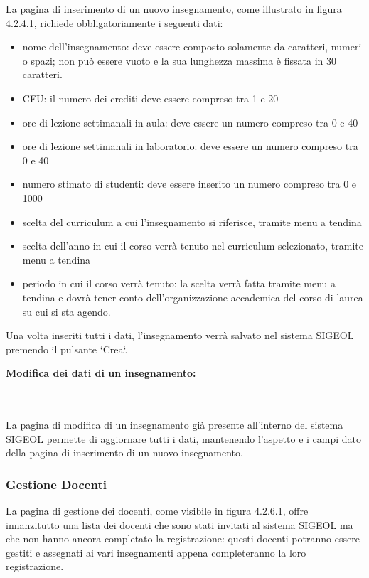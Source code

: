 \documentclass[11pt,a4paper]{article}
\begin{document}
La pagina di inserimento di un nuovo insegnamento, come illustrato in figura 4.2.4.1, richiede obbligatoriamente i seguenti dati:
\begin{itemize}
 \item nome dell'insegnamento: deve essere composto solamente da caratteri, numeri o spazi; non può essere vuoto e la sua lunghezza massima è fissata in 30 caratteri.
 \item CFU: il numero dei crediti deve essere compreso tra 1 e 20
 \item ore di lezione settimanali in aula: deve essere un numero compreso tra 0 e 40
 \item ore di lezione settimanali in laboratorio: deve essere un numero compreso tra 0 e 40
 \item numero stimato di studenti: deve essere inserito un numero compreso tra 0 e 1000
 \item scelta del curriculum a cui l'insegnamento si riferisce, tramite menu a tendina
 \item scelta dell'anno in cui il corso verrà tenuto nel curriculum selezionato, tramite menu a tendina
 \item periodo in cui il corso verrà tenuto: la scelta verrà fatta tramite menu a tendina e dovrà tener conto dell'organizzazione accademica del corso di laurea su cui si sta agendo.
\end{itemize}
Una volta inseriti tutti i dati, l'insegnamento verrà salvato nel sistema SIGEOL premendo il pulsante `Crea`.
\newline \newline
\begin{large}\textbf{Modifica dei dati di un insegnamento:}\end{large}
\\ \\
La pagina di modifica di un insegnamento già presente all'interno del sistema SIGEOL permette di aggiornare tutti i dati, mantenendo l'aspetto e i campi dato della pagina di inserimento di un nuovo insegnamento.
\subsubsection{Gestione Docenti}
La pagina di gestione dei docenti, come visibile in figura 4.2.6.1, offre innanzitutto una lista dei docenti che sono stati invitati al sistema SIGEOL ma che non hanno ancora completato la registrazione: questi docenti potranno essere gestiti e assegnati ai vari insegnamenti appena completeranno la loro registrazione.
\end{document}
